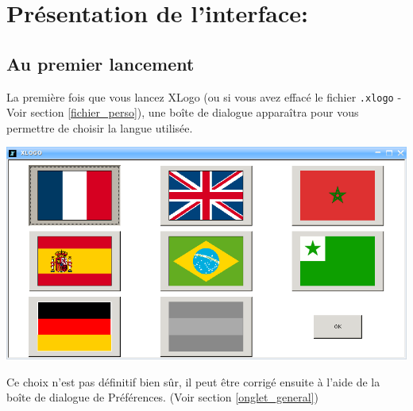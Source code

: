 \chapter{Présentation de l'interface:}
\section{Au premier lancement}
La première fois que vous lancez XLogo (ou si vous avez effacé le fichier \texttt{.xlogo} - Voir section \ref{fichier_perso}), une boîte de dialogue apparaîtra pour vous permettre de choisir la langue utilisée.
\begin{center}
\includegraphics[scale=0.2]{images/CaptureLangue.png} 
\end{center}
Ce choix n'est pas définitif bien sûr, il peut être corrigé ensuite à l'aide de la boîte de dialogue de Préférences. (Voir section \ref{onglet_general})

